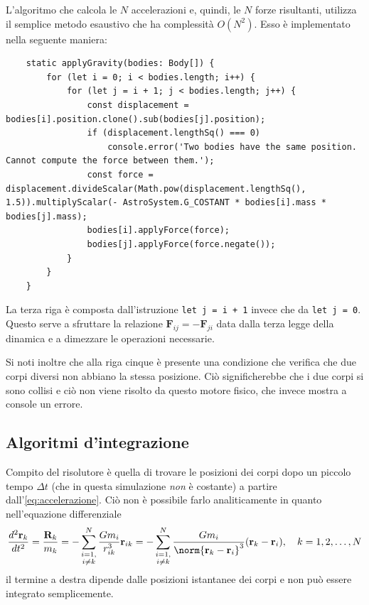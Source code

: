 \documentclass[11pt]{article}
\begin{document}
    L'algoritmo che calcola le $N$ accelerazioni e, quindi, le $N$ forze risultanti, utilizza il semplice metodo esaustivo che ha complessità $O(N^2)$. Esso è implementato nella seguente maniera:
    \begin{verbatim}
	static applyGravity(bodies: Body[]) {
		for (let i = 0; i < bodies.length; i++) {
			for (let j = i + 1; j < bodies.length; j++) {
				const displacement = bodies[i].position.clone().sub(bodies[j].position);
				if (displacement.lengthSq() === 0)
					console.error('Two bodies have the same position. Cannot compute the force between them.'); 
				const force = displacement.divideScalar(Math.pow(displacement.lengthSq(), 1.5)).multiplyScalar(- AstroSystem.G_COSTANT * bodies[i].mass * bodies[j].mass);
				bodies[i].applyForce(force);
				bodies[j].applyForce(force.negate());
			}
		}
	}    
    \end{verbatim}

	La terza riga è composta dall'istruzione \texttt{let j = i + 1} invece che da \texttt{let j = 0}. Questo serve a sfruttare la relazione $\mathbf{F}_{ij} = -\mathbf{F}_{ji}$ data dalla terza legge della dinamica e a dimezzare le operazioni necessarie.

	Si noti inoltre che alla riga cinque è presente una condizione che verifica che due corpi diversi non abbiano la stessa posizione. Ciò significherebbe che i due corpi si sono collisi e ciò non viene risolto da questo motore fisico, che invece mostra a console un errore.

	\subsection{Algoritmi d'integrazione}
	
	Compito del risolutore è quella di trovare le posizioni dei corpi dopo un piccolo tempo $\Delta t$ (che in questa simulazione \emph{non} è costante) a partire dall'\cref{eq:accelerazione}. Ciò non è possibile farlo analiticamente in quanto nell'equazione differenziale 
	\begin{equation*}
		\frac{d^2\mathbf{r}_k}{dt^2} = \frac{\mathbf{R}_k}{m_k} = -\sum_{\substack{i = 1,\\i \neq k}}^{N}{\frac{G m_i}{r_{ik}^{3}}\mathbf{r}_{ik}} = -\sum_{\substack{i = 1,\\i \neq k}}^{N}{\frac{G m_i}{\norm{\mathbf{r}_k - \mathbf{r}_i}^3}(\mathbf{r}_k - \mathbf{r}_i)},\quad k = 1, 2, \dots, N
	\end{equation*} 
	il termine a destra dipende dalle posizioni istantanee dei corpi e non può essere integrato semplicemente.
\end{document}
